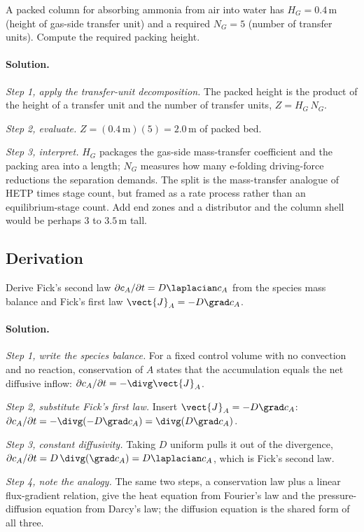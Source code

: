 \begin{exercise}
A packed column for absorbing ammonia from air into water has
$H_G = 0.4\,\text{m}$ (height of gas-side transfer unit) and a
required $N_G = 5$ (number of transfer units). Compute the required
packing height.

\paragraph{Solution.}
\textit{Step 1, apply the transfer-unit decomposition.} The packed
height is the product of the height of a transfer unit and the number
of transfer units, $Z = H_G\,N_G$.

\textit{Step 2, evaluate.} $Z = (0.4\,\si{\meter})(5) = 2.0\,\si{
\meter}$ of packed bed.

\textit{Step 3, interpret.} $H_G$ packages the gas-side mass-transfer
coefficient and the packing area into a length; $N_G$ measures how many
e-folding driving-force reductions the separation demands. The split is
the mass-transfer analogue of HETP times stage count, but framed as a
rate process rather than an equilibrium-stage count. Add end zones and
a distributor and the column shell would be perhaps $3$ to
$3.5\,\si{\meter}$ tall.
\end{exercise}

\subsection*{Derivation}

\begin{exercise}
Derive Fick's second law $\partial c_A/\partial t = D \laplacian c_A$
from the species mass balance and Fick's first law $\vect{J}_A = -D
\grad c_A$.

\paragraph{Solution.}
\textit{Step 1, write the species balance.} For a fixed control volume
with no convection and no reaction, conservation of $A$ states that the
accumulation equals the net diffusive inflow:
$\partial c_A/\partial t = -\divg \vect{J}_A$.

\textit{Step 2, substitute Fick's first law.} Insert $\vect{J}_A =
-D\grad c_A$:
$\partial c_A/\partial t = -\divg(-D\grad c_A) = \divg(D\grad c_A)$.

\textit{Step 3, constant diffusivity.} Taking $D$ uniform pulls it out
of the divergence, $\partial c_A/\partial t = D\,\divg(\grad c_A) =
D\laplacian c_A$, which is Fick's second law.

\textit{Step 4, note the analogy.} The same two steps, a conservation
law plus a linear flux-gradient relation, give the heat equation from
Fourier's law and the pressure-diffusion equation from Darcy's law; the
diffusion equation is the shared form of all three.
\end{exercise}

